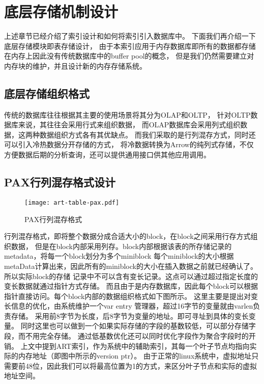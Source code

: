 \section{底层存储机制设计}
上述章节已经介绍了索引设计和如何将索引引入数据库中。
下面我们再介绍一下底层存储模块即表存储设计，
由于本索引应用于内存数据库即所有的数据都存储在内存上因此没有传统数据库中的buffer pool的概念，
但是我们仍然需要建立对内存块的维护，并且设计新的内存存储系统。

\subsection{底层存储组织格式}
传统的数据库往往根据其主要的使用场景将其分为OLAP和OLTP，
针对OLTP数据库来说，其往往会采用行式来组织数据，
而OLAP数据库会采用列式组织数据，这两种数据组织方式各有其优缺点。
而我们采取的是行列混存方式，同时还可以引入冷热数据分开存储的方式，
将冷数据转换为Arrow的纯列式存储，不仅方便数据后期的分析查询，还可以提供通用接口供其他应用调用。

\subsection{PAX行列混存格式设计}

\begin{figure}[h]
  \centering
  \texttt{[image: art-table-pax.pdf]}
  \caption{PAX行列混存格式}
  \label{fig:art-table-pax}
\end{figure}

行列混存格式，即将整个数据分成合适大小的block，在block之间采用行存方式组织数据，
但是在block内部采用列存。block内部根据该表的所存储记录的metadata，将每一个block划分为多个miniblock
每个miniblock的大小根据metaData计算出来，因此所有的miniblock的大小在插入数据之前就已经确认了。所以实际block的存储
记录中不可以含有变长记录。这点可以通过超过指定长度的变长数据就通过指针方式存储。
而且由于是内存数据库，因此每个block可以根据指针直接访问。每个block内部的数据组织格式如下图所示。
这里主要是提出对变长信息的优化，由系统维护一个var entry 管理器，超过16字节的变量就由varlen负责存储。
采用前8字节为长度，后8字节为变量的地址。即可寻址到具体的变长变量。
同时这里也可以做到一个如果实际存储的字段的基数较低，可以部分存储字段，而不用完全存储。
通过低基数优化还可以同时优化字段作为聚合字段时的开销。
上文中提到ART索引，作为系统中的辅助索引，其每一个叶子节点均指向实际的内存地址（即图中所示的version ptr）。
由于正常的linux系统中，虚拟地址只需要前48位，因此我们可以将最高位置为1的方式，来区分叶子节点和实际的虚拟地址空间。

